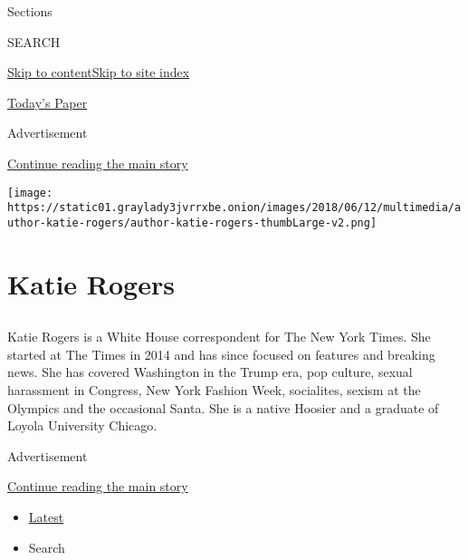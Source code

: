 Sections

SEARCH

\protect\hyperlink{site-content}{Skip to
content}\protect\hyperlink{site-index}{Skip to site index}

\href{https://myaccount.nytimes3xbfgragh.onion/auth/login?response_type=cookie\&client_id=vi}{}

\href{https://www.nytimes3xbfgragh.onion/section/todayspaper}{Today's
Paper}

Advertisement

\protect\hyperlink{after-top}{Continue reading the main story}

\texttt{[image: https://static01.graylady3jvrrxbe.onion/images/2018/06/12/multimedia/author-katie-rogers/author-katie-rogers-thumbLarge-v2.png]}

\hypertarget{katie-rogers}{%
\section{Katie Rogers}\label{katie-rogers}}

\hypertarget{section}{%
\subsection{}\label{section}}

Katie Rogers is a White House correspondent for The New York Times. She
started at The Times in 2014 and has since focused on features and
breaking news. She has covered Washington in the Trump era, pop culture,
sexual harassment in Congress, New York Fashion Week, socialites, sexism
at the Olympics and the occasional Santa. She is a native Hoosier and a
graduate of Loyola University Chicago.

Advertisement

\protect\hyperlink{after-mid1}{Continue reading the main story}

\begin{itemize}
\tightlist
\item
  \protect\hyperlink{stream-panel}{Latest}
\item
  Search
\end{itemize}

